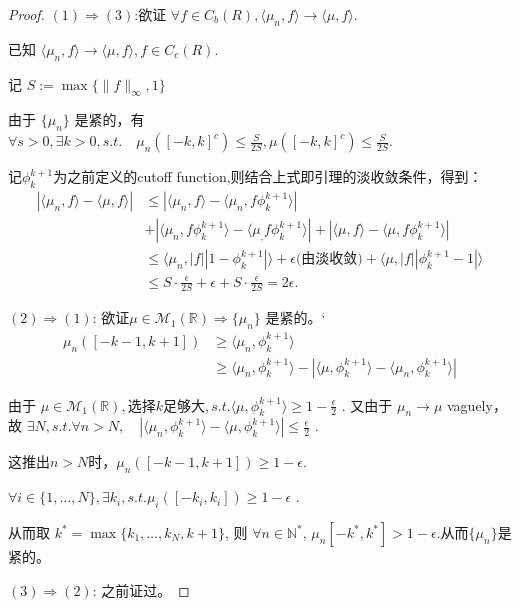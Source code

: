 \begin{proof}
   $(1) \Rightarrow (3)$:欲证 $\forall f \in C_b(R), \langle\mu_ n, f\rangle \rightarrow \langle \mu, f\rangle. $

已知 $\langle\mu_ n, f\rangle \rightarrow \langle \mu, f\rangle, f \in C_c(R).$

记 $S := \max\{\|f\|_{\infty}, 1\}$

由于 $\{\mu_ n\}$ 是紧的，有$\forall s > 0, \exists k > 0, s.t.\quad \mu_n([-k, k]^c) \leq \frac{S}{2S},\mu([-k, k]^c) \leq \frac{S}{2S}$.

记$\phi_k^{k+1}$为之前定义的cutoff function,则结合上式即引理的淡收敛条件，得到：
\begin{equation*}
    \begin{aligned}
        |\langle\mu_ n, f\rangle - \langle\mu, f\rangle| &\leq |\langle\mu_ n, f\rangle - \langle\mu_ n, f\phi_k^{k+1}\rangle|\\&+|\langle\mu_ n, f\phi_k^{k+1}\rangle - \langle\mu_, f\phi_k^{k+1}\rangle| + |\langle\mu, f\rangle - \langle\mu, f\phi_k^{k+1}\rangle|\\
        &\leq \langle\mu_ n, |f||1-\phi_k^{k+1}| \rangle + \epsilon\text{(由淡收敛}) + \langle\mu , |f||\phi_k^{k+1}-1|\rangle\\
        &\leq S\cdot \frac{\epsilon}{2S} + \epsilon + S\cdot\frac{\epsilon}{2S} = 2\epsilon.
    \end{aligned}
\end{equation*}



$(2) \Rightarrow (1)$: 欲证$ \mu\in \mathcal{M}_1(\mathbb{R}) \Rightarrow \{\mu_ n\}$ 是紧的。`
\begin{equation*}
    \begin{aligned}
        \mu_ n ([-k-1, k+1])&\ge \langle\mu_ n, \phi_k^{k+1}\rangle\\
        &\geq \langle\mu_ n, \phi_k^{k+1}\rangle - |\langle\mu, \phi_k^{k+1}\rangle - \langle\mu_ n, \phi_k^{k+1}\rangle|
    \end{aligned}
\end{equation*}

由于 $\mu\in \mathcal{M}_1(\mathbb{R}), \text{选择} k \text{足够大}, s.t. \langle\mu, \phi_k^{k+1}\rangle\ge 1 - \frac{\epsilon}{2}$ .   
又由于 $\mu_n \rightarrow \mu$ vaguely，故
$\exists N, s.t. \forall n > N,\quad  | \langle\mu_n, \phi_k^{k+1}\rangle-\langle\mu, \phi_k^{k+1}\rangle | \leq \frac{\epsilon}{2}$ .

这推出$n>N$时，$\mu_n([-k-1,k+1])\ge 1-\epsilon$.

$\forall i \in \{1, \ldots, N\},\exists k_i, s.t. \mu_i([-k_i,k_i])\ge 1-\epsilon$ .

从而取 $k^* = \max \{k_1, \ldots, k_N, k+1\}$, 则 $\forall n \in \mathbb{N}^*$,
$\mu_n [-k^*, k^*] > 1 - \epsilon$.从而$\{\mu_n\}$是紧的。

$(3) \Rightarrow (2)$: 之前证过。
\end{proof}

